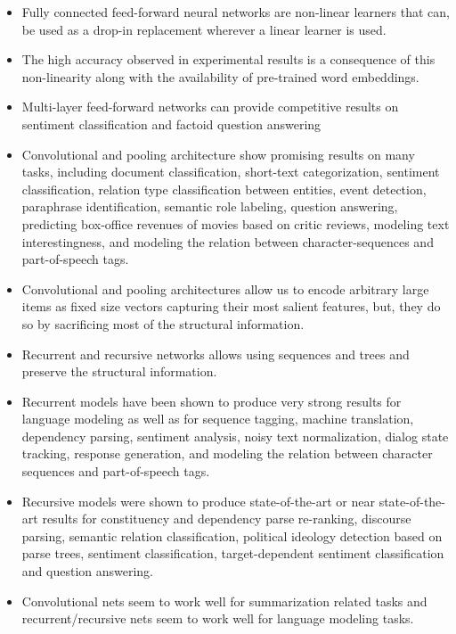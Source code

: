 \documentclass[11pt,a4paper]{article}
\begin{document}
  \begin{itemize}
    \item
    Fully connected feed-forward neural networks are non-linear learners that can, be used as a drop-in replacement wherever a linear learner is used.
    \item
    The high accuracy observed in experimental results is a consequence of this non-linearity along with the availability of pre-trained word embeddings.
    \item
    Multi-layer feed-forward networks can provide competitive results on sentiment classification and factoid question answering
    \item
    Convolutional and pooling architecture show promising results on many tasks, including document classification, short-text categorization, sentiment classification, relation type classification between entities, event detection, paraphrase identification, semantic role labeling, question answering, predicting box-office revenues of movies based on critic reviews, modeling text interestingness, and modeling the relation between character-sequences and part-of-speech tags.
    \item
    Convolutional and pooling architectures allow us to encode arbitrary large items as fixed size vectors capturing their most salient features, but, they do so by sacrificing most of the structural information.
    \item
    Recurrent and recursive networks allows using sequences and trees and preserve the structural information.
    \item
    Recurrent models have been shown to produce very strong results for language modeling as well as for sequence tagging, machine translation, dependency parsing, sentiment analysis, noisy text normalization, dialog state tracking, response generation, and modeling the relation between character sequences and part-of-speech tags.
    \item
    Recursive models were shown to produce state-of-the-art or near state-of-the-art results for constituency and dependency parse re-ranking, discourse parsing, semantic relation classification, political ideology detection based on parse trees, sentiment classification, target-dependent sentiment classification and question answering.
    \item
    Convolutional nets seem to work well for summarization related tasks and recurrent/recursive nets seem to work well for language modeling tasks.
  \end{itemize}
\end{document}
